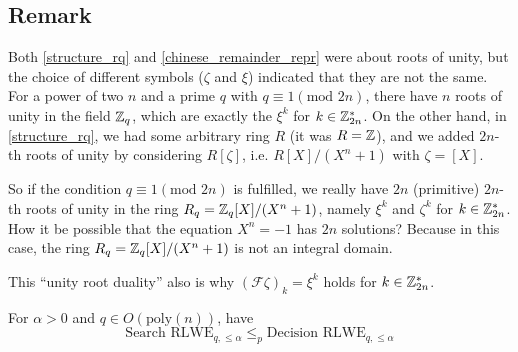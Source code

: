 \subsection{Remark}
Both \ref{structure_rq} and \ref{chinese_remainder_repr} were about roots of unity, but the choice of different symbols ($\zeta$ and $\xi$) indicated that they are not the same. For a power of two $n$ and a prime $q$ with $q \equiv 1 (\text{mod } 2n)$, there have $n$ roots of unity in the field $\mathbb{Z}_q$, which are exactly the $\xi^k$ for $k \in \mathbb{Z}_{2n}^*$. On the other hand, in \ref{structure_rq}, we had some arbitrary ring $R$ (it was $R = \mathbb{Z}$), and we added $2n$-th roots of unity by considering $R[\zeta]$, i.e. $R[X]/(X^n+1)$ with $\zeta = [X]$.

So if the condition $q \equiv 1 (\text{mod } 2n)$ is fulfilled, we really have $2n$ (primitive) $2n$-th roots of unity in the ring $R_q = \mathbb{Z}_q[X]/(X^n+1)$, namely $\xi^k$ and $\zeta^k$ for $k \in \mathbb{Z}_{2n}^*$. How it be possible that the equation $X^n = -1$ has $2n$ solutions? Because in this case, the ring $R_q = \mathbb{Z}_q[X]/(X^n+1)$ is not an integral domain.

This ``unity root duality'' also is why $(\mathcal{F}\zeta)_k = \xi^k$ holds for $k \in \mathbb{Z}_{2n}^*$.

\label{rlwe_decision_to_search}
For $\alpha > 0$ and $q \in O(\mathrm{poly}(n))$, have
\begin{equation}
\text{Search RLWE}_{q, \leq \alpha} \leq_p \text{Decision RLWE}_{q, \leq \alpha} \nonumber
\end{equation}

